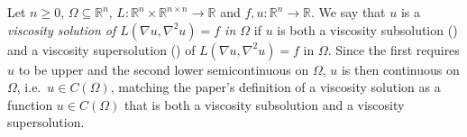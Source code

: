 \begin{definition}[Viscosity solution of $L(\nabla u,\nabla^2u)=f$, paper Def.~def-vis]
Let $n\ge0$, $\Omega\subseteq\mathbb R^n$, $L:\mathbb R^n\times\mathbb R^{n\times n}\to\mathbb R$ and $f,u:\mathbb R^n\to\mathbb R$. We say that $u$ is a \emph{viscosity solution of $L(\nabla u,\nabla^2u)=f$ in $\Omega$} if $u$ is both a viscosity subsolution () and a viscosity supersolution () of $L(\nabla u,\nabla^2u)=f$ in $\Omega$. Since the first requires $u$ to be upper and the second lower semicontinuous on $\Omega$, $u$ is then continuous on $\Omega$, i.e.\ $u\in C(\Omega)$, matching the paper's definition of a viscosity solution as a function $u\in C(\Omega)$ that is both a viscosity subsolution and a viscosity supersolution.
\end{definition}
